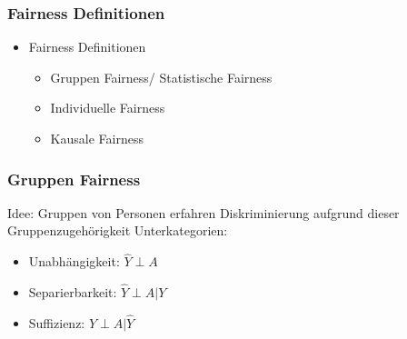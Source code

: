 \documentclass[aspectratio=169]{beamer}
\begin{document}
\begin{frame}
    \frametitle{Fairness Definitionen}
    \begin{itemize}
        \item Fairness Definitionen
        \begin{itemize}
            \item Gruppen Fairness/ Statistische Fairness
            \item Individuelle Fairness
            \item Kausale Fairness
        \end{itemize}
    \end{itemize}
    
\end{frame}



\begin{frame}
	\frametitle{Gruppen Fairness}
	Idee: Gruppen von Personen erfahren Diskriminierung aufgrund dieser Gruppenzugehörigkeit
	Unterkategorien:
	\begin{itemize}
		\item Unabhängigkeit: $\hat{Y} \perp A$
		\item Separierbarkeit: $\hat{Y} \perp A | Y$ 
		\item Suffizienz: $Y \perp A | \hat{Y}$
	\end{itemize}
\end{frame}
\end{document}

